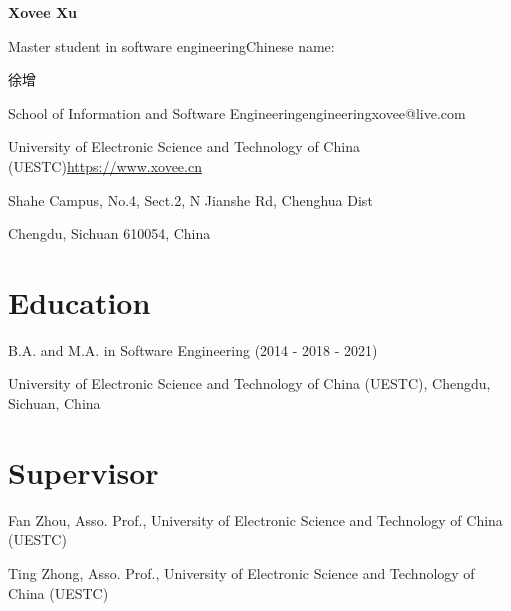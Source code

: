 \documentclass{article}
\begin{document}
\begin{center}
    \Huge{
    \textbf{Xovee Xu}}
\end{center}



\noindent Master student in software engineering\hfill Chinese name: \begin{CJK*}{UTF8}{gkai}徐增\end{CJK*}

\noindent School of Information and Software Engineeringengineering\hfill xovee@live.com

\noindent University of Electronic Science and Technology of China (UESTC)\hfill \url{https://www.xovee.cn}

\noindent Shahe Campus, No.4, Sect.2, N Jianshe Rd, Chenghua Dist

\noindent Chengdu, Sichuan 610054, China

\setlength{\parskip}{3pt}


\vspace{-8pt}
\section*{Education}
\vspace{-8pt}
\indent 


B.A. and M.A. in Software Engineering (2014 - 2018 - 2021)

University of Electronic Science and Technology of China (UESTC), Chengdu, Sichuan, China

\vspace{-8pt}
\section*{Supervisor}
\vspace{-8pt}
\indent

Fan Zhou, Asso. Prof., University of Electronic Science and Technology of China (UESTC)

Ting Zhong, Asso. Prof., University of Electronic Science and Technology of China (UESTC)

\end{document}
